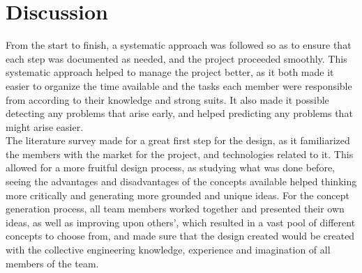 \documentclass[12pt]{report}
\begin{document}
\chapter{Discussion}
From the start to finish, a systematic approach was followed so as to ensure that each step was documented as needed, and the project proceeded smoothly. This systematic approach helped to manage the project better, as it both made it easier to organize the time available and the tasks each member were responsible from according to their knowledge and strong suits. It also made it possible detecting any problems that arise early, and helped predicting any problems that might arise easier. \\

The literature survey made for a great first step for the design, as it familiarized the members with the market for the project, and technologies related to it. This allowed for a more fruitful design process, as studying what was done before, seeing the advantages and disadvantages of the concepts available helped thinking more critically and generating more grounded and unique ideas. For the concept generation process, all team members worked together and presented their own ideas, as well as improving upon others’,  which resulted in a vast pool of different concepts to choose from, and made sure that the design created would be created with the collective engineering knowledge, experience and imagination of all members of the team. \\
\end{document}
